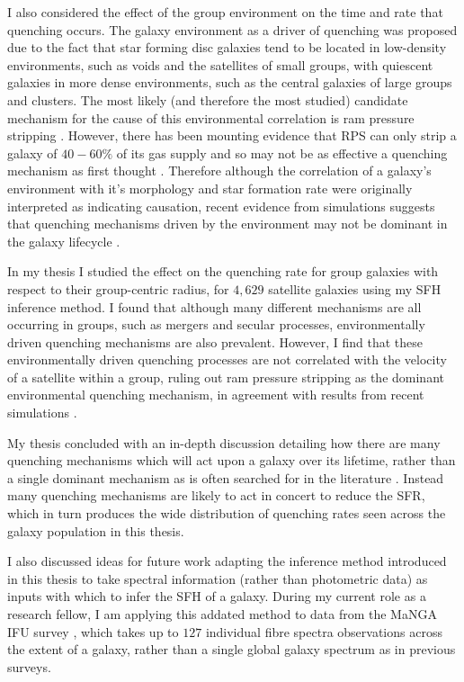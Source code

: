 \documentclass[12pt]{article}
\begin{document}
I also considered the effect of the group environment on the time and rate that quenching occurs. The galaxy environment as a driver of quenching was proposed due to the fact that star forming disc galaxies tend to be located in low-density environments, such as voids and the satellites of small groups, with quiescent galaxies in more dense environments, such as the central galaxies of large groups and clusters. The most likely (and therefore the most studied) candidate mechanism for the cause of this environmental correlation is ram pressure stripping \citep{abadi99, poggianti99}. However, there has been mounting evidence that RPS can only strip a galaxy of $40-60\%$ of its gas supply \citep{fillingham16} and so may not be as effective a quenching mechanism as first thought \citep{emerick16}. Therefore although the correlation of a galaxy's environment with it's morphology and star formation rate were originally interpreted as indicating causation, recent evidence from simulations suggests that quenching mechanisms driven by the environment may not be dominant in the galaxy lifecycle \citep{kimm09, kimm11, hirschmann14, wang14, phillips15}.

In my thesis I studied the effect on the quenching rate for group galaxies with respect to their group-centric radius, for $4,629$ satellite galaxies using my SFH inference method. I found that although many different mechanisms are all occurring in groups, such as mergers and secular processes, environmentally driven quenching mechanisms are also prevalent. However, I find that these environmentally driven quenching processes are not correlated with the velocity of a satellite within a group, ruling out ram pressure stripping as the dominant environmental quenching mechanism, in agreement with results from recent simulations \citep{fillingham16, emerick16}. 

My thesis concluded with an in-depth discussion detailing how there are many quenching mechanisms which will act upon a galaxy over its lifetime, rather than a single dominant mechanism as is often searched for in the literature \citep{}. Instead many quenching mechanisms are likely to act in concert to reduce the SFR, which in turn produces the wide distribution of quenching rates seen across the galaxy population in this thesis. 

I also discussed ideas for future work adapting the inference method introduced in this thesis to take spectral information (rather than photometric data) as inputs with which to infer the SFH of a galaxy. During my current role as a research fellow, I am applying this addated method to data from the MaNGA IFU survey \citep{bundy15}, which takes up to $127$ individual fibre spectra observations across the extent of a galaxy, rather than a single global galaxy spectrum as in previous surveys. 
\end{document}
